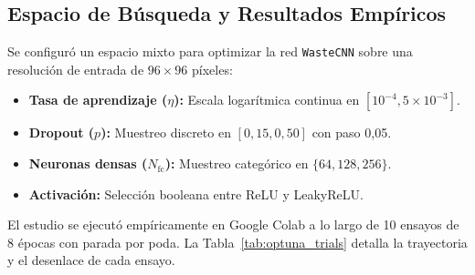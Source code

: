 \documentclass[11pt,a4paper]{article}
\begin{document}
\subsection{Espacio de Búsqueda y Resultados Empíricos}
Se configuró un espacio mixto para optimizar la red \texttt{WasteCNN} sobre una resolución de entrada de $96\times 96$ píxeles:
\begin{itemize}[noitemsep]
    \item \textbf{Tasa de aprendizaje ($\eta$):} Escala logarítmica continua en $[10^{-4}, 5\times 10^{-3}]$.
    \item \textbf{Dropout ($p$):} Muestreo discreto en $[0,15, 0,50]$ con paso 0,05.
    \item \textbf{Neuronas densas ($N_{\text{fc}}$):} Muestreo categórico en $\{64, 128, 256\}$.
    \item \textbf{Activación:} Selección booleana entre ReLU y LeakyReLU.
\end{itemize}

El estudio se ejecutó empíricamente en Google Colab a lo largo de 10 ensayos de 8 épocas con parada por poda. La Tabla~\ref{tab:optuna_trials} detalla la trayectoria y el desenlace de cada ensayo.
\end{document}
